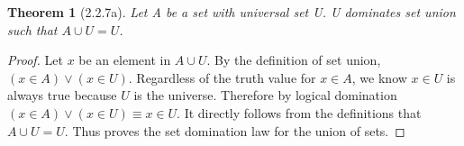\documentclass[a4paper, 12pt]{article}
\theoremstyle{plain}
\newtheorem*{theorem*}{Theorem}
\begin{document}
	
	\begin{theorem*}[2.2.7a]
		Let A be a set with universal set U. U dominates set union such that $A \cup U = U$.
	\end{theorem*}
	
	\begin{proof}
		Let $x$ be an element in $A \cup U$. By the definition of set union, \newline 
		$(x \in A) \lor (x \in U)$. Regardless of the truth value for $x \in A$, we know 
		$x \in U$ is always true because $U$ is the universe. Therefore by logical domination 
		$(x \in A) \lor (x \in U) \equiv x \in U$. It directly follows from the definitions 
		that $A \cup U = U$. Thus proves the set domination law for the union of sets.
	\end{proof}
\end{document}
